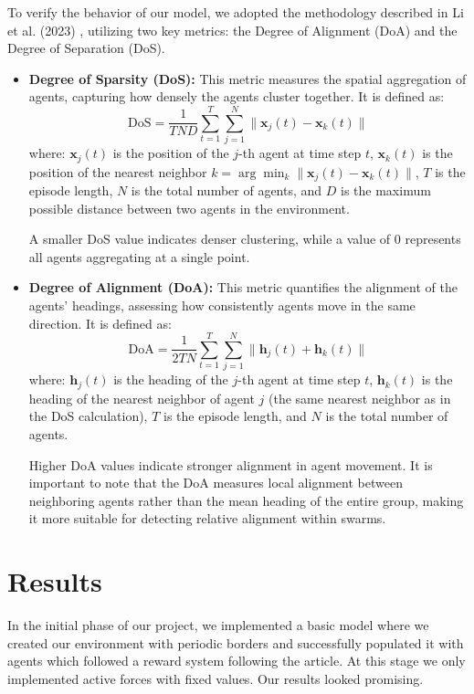 \documentclass[9pt]{pnas-new}
\begin{document}
To verify the behavior of our model, we adopted the methodology described in Li et al. (2023) \cite{li2023predator}, utilizing two key metrics: the Degree of Alignment (DoA) and the Degree of Separation (DoS).

\begin{itemize}
    \item \textbf{Degree of Sparsity (DoS):} This metric measures the spatial aggregation of agents, capturing how densely the agents cluster together. It is defined as:
    \[
    \text{DoS} = \frac{1}{TND} \sum_{t=1}^T \sum_{j=1}^N \| \mathbf{x}_j(t) - \mathbf{x}_k(t) \|
    \]
    where: \( \mathbf{x}_j(t) \) is the position of the \(j\)-th agent at time step \(t\), \( \mathbf{x}_k(t) \) is the position of the nearest neighbor \(k = \arg\min_k \| \mathbf{x}_j(t) - \mathbf{x}_k(t) \| \), \(T\) is the episode length, \(N\) is the total number of agents, and \(D\) is the maximum possible distance between two agents in the environment.
    
    A smaller DoS value indicates denser clustering, while a value of 0 represents all agents aggregating at a single point.

    \item \textbf{Degree of Alignment (DoA):} This metric quantifies the alignment of the agents' headings, assessing how consistently agents move in the same direction. It is defined as:
    \[
    \text{DoA} = \frac{1}{2TN} \sum_{t=1}^T \sum_{j=1}^N \| \mathbf{h}_j(t) + \mathbf{h}_k(t) \|
    \]
    where: \( \mathbf{h}_j(t) \) is the heading of the \(j\)-th agent at time step \(t\), \( \mathbf{h}_k(t) \) is the heading of the nearest neighbor of agent \(j\) (the same nearest neighbor as in the DoS calculation), \(T\) is the episode length, and \(N\) is the total number of agents.
    
    Higher DoA values indicate stronger alignment in agent movement. It is important to note that the DoA measures local alignment between neighboring agents rather than the mean heading of the entire group, making it more suitable for detecting relative alignment within swarms.
\end{itemize}

\section*{Results}


In the initial phase of our project, we implemented a basic model where we created our environment with periodic borders and successfully populated it with agents which followed a reward system following the article. At this stage we only implemented active forces with fixed values. Our results looked promising.
\end{document}
